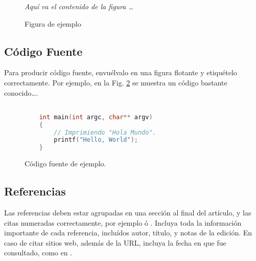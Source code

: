 \documentclass[a4paper,10pt,twocolumn]{article}
\begin{document}
		\begin{figure}[htb]%
		\begin{center}
			\emph{Aquí va el contenido de la figura \ldots}
		\end{center}
		\caption{Figura de ejemplo \label{fig:ex}}%
		\end{figure}

	\subsection{Código Fuente}\label{sub:listings}
		Para producir código fuente, envuélvalo en una figura flotante y
		etiquételo correctamente. Por ejemplo, en la Fig. \ref{fig:code}
		se muestra un código bastante conocido\ldots.


		\begin{figure}[htb]%
			\begin{lstlisting}[language=c]%

    int main(int argc, char** argv)
    {
        // Imprimiendo "Hola Mundo".
        printf("Hello, World");
    }

			\end{lstlisting}
		\caption{Código fuente de ejemplo.\label{fig:code}}
		\end{figure}

	\subsection{Referencias}
  	Las referencias deben estar agrupadas en una sección al final del artículo,
  	y las citas numeradas correctamente, por ejemplo \cite{knuth} ó \cite{goedel}.
  	Incluya toda la información importante de cada referencia, incluídos autor,
  	título, y notas de la edición. En caso de citar sitios web, además
  	de la URL, incluya la fecha en que fue consultado, como en \cite{wiki}.




\end{document}
